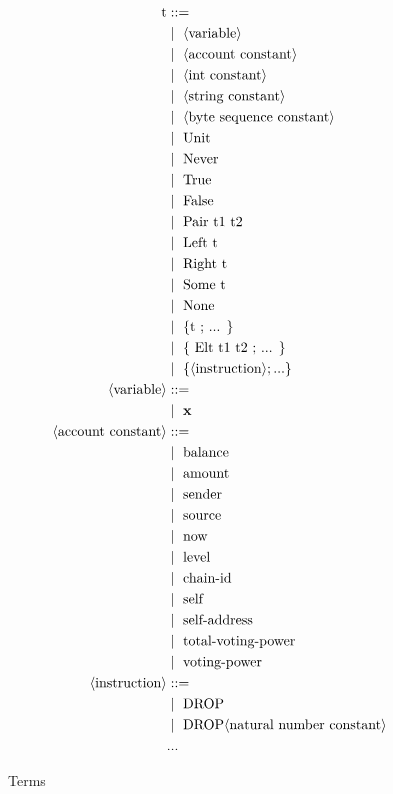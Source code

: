 \documentclass[a4paper,UKenglish,cleveref, autoref, thm-restate]{lipics-v2021}
\begin{document}
\begin{figure}[]
\begin{align*}
\text{t} &::= \\
   &\mid\ \langle \text{variable} \rangle \\
   &\mid\ \langle \text{account constant} \rangle \\
   &\mid\ \langle \text{int constant} \rangle \\
   &\mid\ \langle \text{string constant} \rangle \\
   &\mid\ \langle \text{byte sequence constant} \rangle \\
   &\mid\ \text{Unit} \\
   &\mid\ \text{Never} \\
   &\mid\ \text{True} \\
   &\mid\ \text{False} \\
   &\mid\ \text{Pair}\ \text{t1 t2} \\
   &\mid\ \text{Left}\ \text{t}\\
   &\mid\ \text{Right}\ \text{t}\\
   &\mid\ \text{Some}\ \text{t}\\
   &\mid\ \text{None} \\
   &\mid\ \text{\{t ; ... \}}\\
   &\mid\ \text{\{ Elt t1 t2 ; ... \}}\\
   &\mid\ \{ \langle\text{instruction}\rangle; ... \}   \\
\langle \text{variable} \rangle &::= \\ 
   &\mid\ \textbf{x}\\
\langle \text{account constant} \rangle &::= \\ 
   &\mid\ \text{balance} \\
   &\mid\ \text{amount} \\
   &\mid\ \text{sender} \\
   &\mid\ \text{source} \\
   &\mid\ \text{now} \\
   &\mid\ \text{level} \\
   &\mid\ \text{chain-id} \\
   &\mid\ \text{self}  \\
   &\mid\ \text{self-address}  \\
   &\mid\ \text{total-voting-power}  \\
   &\mid\ \text{voting-power}  \\
\langle\text{instruction}\rangle &::= \\
  &\mid\ \text{DROP} \\
  &\mid\ \text{DROP} \langle\text{natural number constant}\rangle \\
  &\text{...}
\end{align*}
\caption{Terms}
\label{fig:term}
\end{figure}
\end{document}
